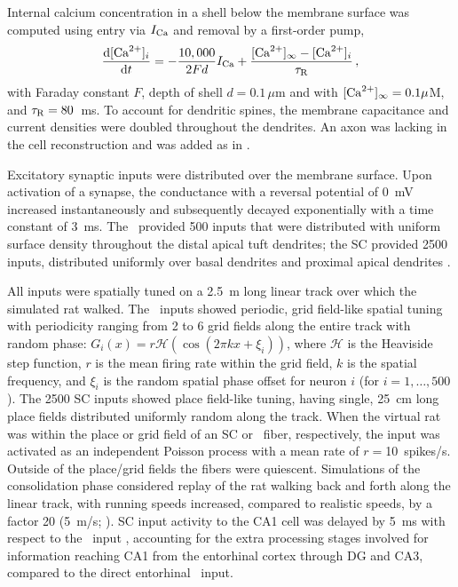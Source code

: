 Internal calcium concentration in a shell below the membrane surface was computed using entry via $I_{\rm Ca}$ and removal by a first-order pump,
\begin{align}
\frac{{\rm d}[{\rm Ca}^{2+}]_i}{{\rm d} t}=
-\frac{10,000}{2 F d} I_{\rm Ca} + \frac{[{\rm Ca}^{2+}]_\infty - [{\rm Ca}^{2+}]_i} {\tau_{\rm R}} \,,
\end{align}
with Faraday constant $F$, depth of shell $d=0.1\,\mu$m and with $[{\rm Ca}^{2+}]_\infty=0.1\mu$M, and $\tau_{\rm R}=80$~ms. To account for dendritic spines, the membrane capacitance and current densities were doubled throughout the dendrites. An axon was lacking in the cell reconstruction and was added as in \cite{Mainen1996}.

Excitatory synaptic inputs were distributed over the membrane surface. Upon activation of a synapse, the conductance with a reversal potential of 0~mV increased instantaneously and subsequently decayed exponentially with a time constant of 3~ms. The \ppca~provided 500 inputs that were distributed with uniform surface density throughout the distal apical tuft dendrites; the SC provided 2500 inputs, distributed uniformly over basal dendrites and proximal apical dendrites \cite{Stuart2007}.

All inputs were spatially tuned on a 2.5~m long linear track over which the simulated rat walked. The \ppca~inputs showed periodic, grid field-like spatial tuning with periodicity ranging from 2 to 6 grid fields along the entire track with random phase: $G_i(x) = r\mathcal{H}(\cos(2 \pi k x + \xi_i))$, where $\mathcal{H}$ is the Heaviside step function, $r$ is the mean firing rate within the grid field, $k$ is the spatial frequency, and $\xi_i$ is the random spatial phase offset for neuron $i$ (for $i=1, \ldots, 500$). The 2500 SC inputs showed place field-like tuning, having single, 25~cm long place fields distributed uniformly random along the track. When the virtual rat was within the place or grid field of an SC or \ppca~fiber, respectively, the input was activated as an independent Poisson process with a mean rate of $r=$10~spikes/s. Outside of the place/grid fields the fibers were quiescent. Simulations of the consolidation phase considered replay of the rat walking back and forth along the linear track, with running speeds increased, compared to realistic speeds, by a factor 20 (5~m/s; \cite{Lee2002}). SC input activity to the CA1 cell was delayed by 5~ms with respect to the \ppca~input \cite{Yeckel1998}, accounting for the extra processing stages involved for information reaching CA1 from the entorhinal cortex through DG and CA3, compared to the direct entorhinal \ppca~input.

